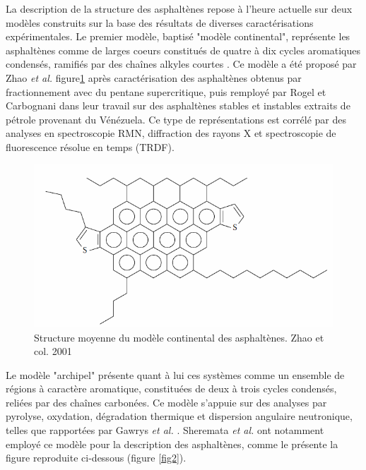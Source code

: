 	La description de la structure des asphaltènes repose à l'heure actuelle sur deux modèles construits sur la base des résultats de diverses caractérisations expérimentales.  
	Le premier modèle, baptisé "modèle continental", représente les asphaltènes comme de larges coeurs constitués de quatre à dix cycles aromatiques condensés, ramifiés par des chaînes alkyles courtes \cite{groenzin2000molecular}. Ce modèle a été proposé par Zhao \textit{et al.} \cite{zhao2001molecular}figure\ref{figZ1} après caractérisation des asphaltènes obtenus par fractionnement avec du pentane supercritique, puis remployé par Rogel et Carbognani \cite{rogel2003density} dans leur travail sur des asphaltènes stables et instables extraits de pétrole provenant du Vénézuela. 
	Ce type de représentations est corrélé par des analyses en spectroscopie RMN, diffraction des rayons X et spectroscopie de fluorescence résolue en temps (TRDF). 
	
	
	
	\begin{figure}
		\centering
		\includegraphics[scale=0.8]{image/Zhao}
		\caption[Structure moyenne du modèle continental des asphaltènes]{Structure moyenne du modèle continental des asphaltènes. Zhao et col. 2001}
		\label{figZ1}
	\end{figure}
	
	
	Le modèle "archipel" présente quant à lui ces systèmes comme un ensemble de régions à caractère aromatique, constituées de deux à trois cycles condensés, reliées par des chaînes carbonées. Ce modèle s'appuie sur des analyses par pyrolyse, oxydation, dégradation thermique et dispersion angulaire neutronique, telles que rapportées par Gawrys \textit{et al.} \cite{gawrys2003role}. Sheremata \textit{et al.}\cite{sheremata2004quantitative} ont notamment employé ce modèle pour la description des asphaltènes, comme le présente la figure reproduite ci-dessous (figure \ref{fig2}). 
	
